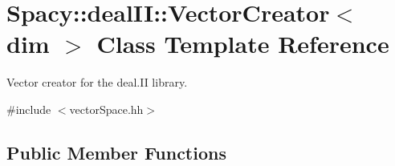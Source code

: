 \hypertarget{classSpacy_1_1dealII_1_1VectorCreator}{\section{\-Spacy\-:\-:deal\-I\-I\-:\-:\-Vector\-Creator$<$ dim $>$ \-Class \-Template \-Reference}
\label{classSpacy_1_1dealII_1_1VectorCreator}
}


\-Vector creator for the deal.\-I\-I library.  




{\ttfamily \#include $<$vector\-Space.\-hh$>$}

\subsection*{\-Public \-Member \-Functions}
